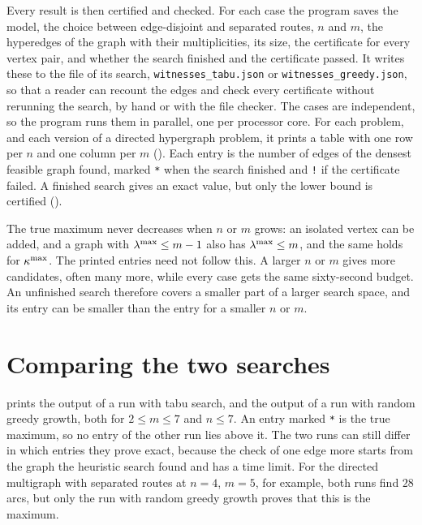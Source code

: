 Every result is then certified and checked.
For each case the program saves the model, the choice between edge-disjoint and separated routes, $n$ and $m$, the hyperedges of the graph with their multiplicities, its size, the certificate for every vertex pair, and whether the search finished and the certificate passed.
It writes these to the file of its search, \texttt{witnesses\_tabu.json} or \texttt{witnesses\_greedy.json}, so that a reader can recount the edges and check every certificate without rerunning the search, by hand or with the file checker.
The cases are independent, so the program runs them in parallel, one per processor core.
For each problem, and each version of a directed hypergraph problem, it prints a table with one row per $n$ and one column per $m$ ().
Each entry is the number of edges of the densest feasible graph found, marked \texttt{*} when the search finished and \texttt{!} if the certificate failed.
A finished search gives an exact value, but only the lower bound is certified ().

The true maximum never decreases when $n$ or $m$ grows: an isolated vertex can be added, and a graph with $\lambda^{\max}\le m-1$ also has $\lambda^{\max}\le m$, and the same holds for $\kappa^{\max}$.
The printed entries need not follow this.
A larger $n$ or $m$ gives more candidates, often many more, while every case gets the same sixty-second budget.
An unfinished search therefore covers a smaller part of a larger search space, and its entry can be smaller than the entry for a smaller $n$ or $m$.



\section{Comparing the two searches}\label{sec:compare-searches}
 prints the output of a run with tabu search, and  the output of a run with random greedy growth, both for $2\le m\le7$ and $n\le7$.
An entry marked \texttt{*} is the true maximum, so no entry of the other run lies above it.
The two runs can still differ in which entries they prove exact, because the check of one edge more starts from the graph the heuristic search found and has a time limit.
For the directed multigraph with separated routes at $n=4$, $m=5$, for example, both runs find $28$ arcs, but only the run with random greedy growth proves that this is the maximum.

